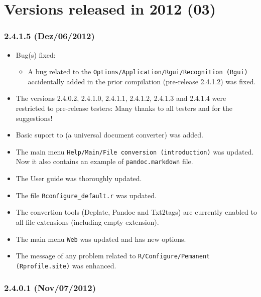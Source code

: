 
\section{Versions released in 2012 (03)}

\subsubsection{2.4.1.5 (Dez/06/2012)}

\begin{itemize}
  \item Bug(s) fixed:
    \begin{itemize}
      \item A bug related to the \texttt{Options/Application/Rgui/Recognition (Rgui)} accidentally added
        in the prior compilation (pre-release 2.4.1.2) was fixed.
    \end{itemize}
  \item The versions 2.4.0.2, 2.4.1.0, 2.4.1.1, 2.4.1.2, 2.4.1.3 and 2.4.1.4 were restricted to pre-release testers:
    Many thanks to all testers and for the suggestions!
  \item Basic suport to  (a universal document converter) was added.
  \item The main menu \texttt{Help/Main/File conversion (introduction)} was updated. Now it also contains an example of \texttt{pandoc.markdown} file.
  \item The User guide was thoroughly updated.
  \item The file \texttt{Rconfigure\_default.r} was updated.
  \item The convertion tools (Deplate, Pandoc and Txt2tags) are currently enabled to all file extensions (including empty extension).
  \item The main menu \texttt{Web} was updated and has new options.
  \item The message of any problem related to \texttt{R/Configure/Pemanent (Rprofile.site)} was enhanced.
\end{itemize}

\subsubsection{2.4.0.1 (Nov/07/2012)}

